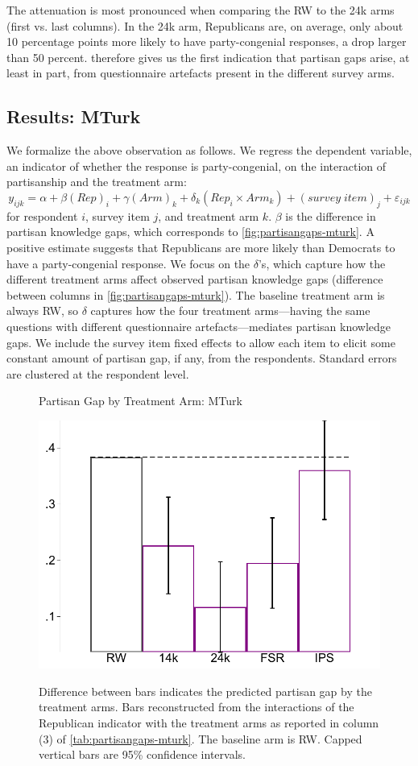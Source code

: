 \documentclass[12pt, letterpaper]{article}
\begin{document}
The attenuation is most pronounced when comparing the RW to the 24k arms (first vs. last columns). 
In the 24k arm, Republicans are, on average, only about 10 percentage points more likely to have party-congenial responses, a drop larger than 50 percent.
 therefore gives us the first indication that partisan gaps arise, at least in part, from questionnaire artefacts present in the different survey arms.

\subsection*{Results: MTurk}
We formalize the above observation as follows. We regress the dependent variable, an indicator of whether the response is party-congenial, on the interaction of partisanship and the treatment arm:
\begin{equation}\label{eq:partisangap-mturk}
y_{ijk} = \alpha + \beta (Rep)_i + \gamma (Arm)_k + \delta_k (Rep_i \times Arm_k) + (survey \; item)_j + \varepsilon_{ijk}
\end{equation}
for respondent $i$, survey item $j$, and treatment arm $k$. $\beta$ is the difference in partisan knowledge gaps, which corresponds to \cref{fig:partisangaps-mturk}. A positive estimate suggests that Republicans are more likely than Democrats to have a party-congenial response.
We focus on the $\delta$'s, which capture how the different treatment arms affect observed partisan knowledge gaps (difference between columns in \cref{fig:partisangaps-mturk}). The baseline treatment arm is always RW, so $\delta$ captures how the four treatment arms---having the same questions with different questionnaire artefacts---mediates partisan knowledge gaps.
We include the survey item fixed effects to allow each item to elicit some constant amount of partisan gap, if any, from the respondents.
Standard errors are clustered at the respondent level.

\begin{figure}[!t]
	\centering
	\caption{Partisan Gap by Treatment Arm: MTurk}
	\includegraphics[width=.55\textwidth]{../figs/mturk-pgag-surveyarms.pdf}
	\label{fig:partisangaps-mturk-reg}
	\caption*{\footnotesize 
		Difference between bars indicates the predicted partisan gap by the treatment arms. 
		Bars reconstructed from the interactions of the Republican indicator with the treatment arms as reported in column (3) of \cref{tab:partisangaps-mturk}.
		The baseline arm is RW.
		Capped vertical bars are 95\% confidence intervals.
	}
\end{figure}
\end{document}
